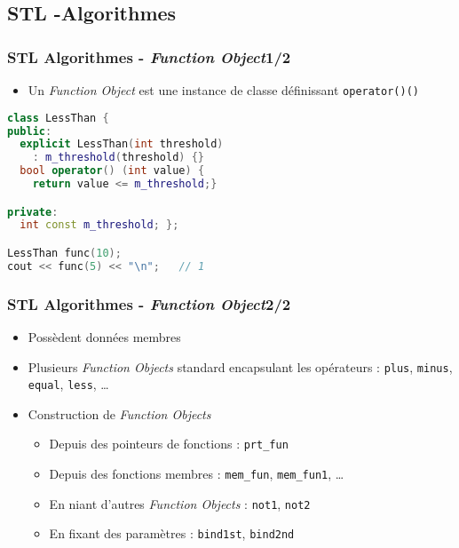 \documentclass[C++.tex]{subfiles}
\begin{document}
\subsection*{STL -Algorithmes}
\begin{frame}[fragile]
	\frametitle{STL Algorithmes - \textit{Function Object}\titlehfill{}1/2}
	\begin{itemize}
		\item Un \textit{Function Object} est une instance de classe définissant \lstinline|operator()()|

		\end{itemize}

	\begin{lstlisting}[language=C++]
class LessThan {
public:
  explicit LessThan(int threshold)
    : m_threshold(threshold) {}
  bool operator() (int value) { 
    return value <= m_threshold;}

private:
  int const m_threshold; };

LessThan func(10);
cout << func(5) << "\n";   // 1\end{lstlisting}
\end{frame}

\begin{frame}
	\frametitle{STL Algorithmes - \textit{Function Object}\titlehfill{}2/2}
	\begin{itemize}
		\item Possèdent données membres


		\item Plusieurs \textit{Function Objects} standard encapsulant les opérateurs : \lstinline|plus|, \lstinline|minus|, \lstinline|equal|, \lstinline|less|, \ldots
		\item Construction de \textit{Function Objects}
		\begin{itemize}
			\item Depuis des pointeurs de fonctions : \lstinline|prt_fun|
			\item Depuis des fonctions membres : \lstinline|mem_fun|, \lstinline|mem_fun1|, \ldots
			\item En niant d'autres \textit{Function Objects} : \lstinline|not1|, \lstinline|not2|
			\item En fixant des paramètres : \lstinline|bind1st|, \lstinline|bind2nd|
		\end{itemize}
	\end{itemize}
\end{frame}
\end{document}
